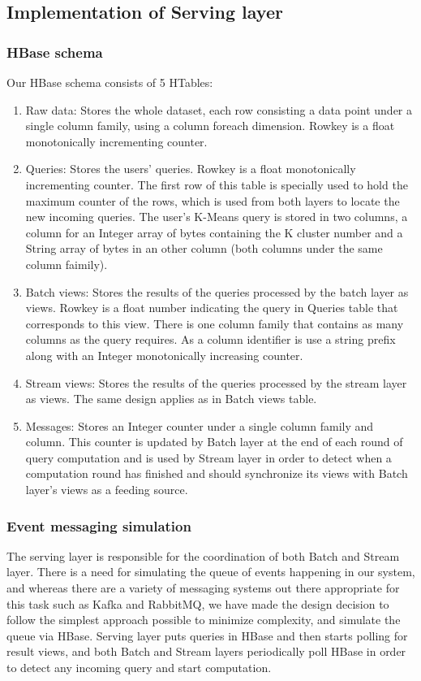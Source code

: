 \documentclass{lmproj}
\begin{document}
\subsection{Implementation of Serving layer}


\subsubsection{HBase schema}
Our HBase schema consists of 5 HTables:

\begin{enumerate}
	\item Raw data: Stores the whole dataset, each row consisting a data point under a single column family, using a column foreach dimension. Rowkey is a float monotonically incrementing counter.
	\item Queries: Stores the users' queries. Rowkey is a float monotonically incrementing counter. The first row of this table is specially used to hold the maximum counter of the rows, which is used from both layers to locate the new incoming queries. The user's K-Means query is stored in two columns, a column for an Integer array of bytes containing the K cluster number and a String array of bytes in an other column (both columns under the same column faimily).
	\item Batch views: Stores the results of the queries processed by the batch layer as views. Rowkey is a float number indicating the query in Queries table that corresponds to this view. There is one column family that contains as many columns as the query requires. As a column identifier is use a string prefix along with an Integer monotonically increasing counter.
	\item Stream views: Stores the results of the queries processed by the stream layer as views. The same design applies as in Batch views table.
	\item Messages: Stores an Integer counter under a single column family and column. This counter is updated by Batch layer at the end of each round of query computation and is used by Stream layer in order to detect when a computation round has finished and should synchronize its views with Batch layer's views as a feeding source. 
\end{enumerate}

\subsubsection{Event messaging simulation}
The serving layer is responsible for the coordination of both Batch and Stream layer. There is a need for simulating the queue of events happening in our system, and whereas there are a variety of messaging systems out there appropriate for this task such as Kafka and RabbitMQ, we have made the design decision to follow the simplest approach possible to minimize complexity, and simulate the queue via HBase. Serving layer puts queries in HBase and then starts polling for result views, and both Batch and Stream layers periodically poll HBase in order to detect any incoming query and start computation.
\end{document}

